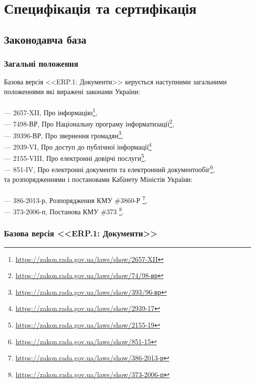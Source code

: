 \chapter{Специфікація та сертифікація}

\section{Законодавча база}

\subsection{Загальні положення}

Базова версія <<ERP.1: Документи>> керується наступними загальними положеннями які
виражені законами України:
\\
\\
--- {2657-XII}, Про інформацію\footnote{\url{https://zakon.rada.gov.ua/laws/show/2657-XII}}, \\
--- {74\/98-ВР}, Про Національну програму інформатизації\footnote{\url{https://zakon.rada.gov.ua/laws/show/74/98-вр}}, \\
--- {393\/96-ВР}, Про звернення громадян\footnote{\url{https://zakon.rada.gov.ua/laws/show/393/96-вр}}, \\
--- {2939-VI}, Про доступ до публічної інформації\footnote{\url{https://zakon.rada.gov.ua/laws/show/2939-17}} \\
--- {2155-VIII}, Про електронні довірчі послуги\footnote{\url{https://zakon.rada.gov.ua/laws/show/2155-19}}, \\
--- {851-IV}, Про електронні документи та електронний документообіг\footnote{\url{https://zakon.rada.gov.ua/laws/show/851-15}}, \\

та розпорядженнями і постановами Кабінету Міністів України:
\\
\\
--- {386-2013-р}, Розпорядження КМУ \#3860-Р \footnote{\url{https://zakon.rada.gov.ua/laws/show/386-2013-р}}, \\
--- {373-2006-п}, Постанова КМУ \#373 \footnote{\url{https://zakon.rada.gov.ua/laws/show/373-2006-п}}. \\

\newpage
\subsection{Базова версія <<ERP.1: Документи>>}

